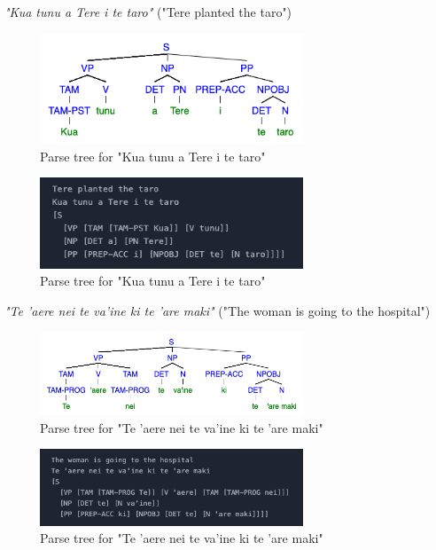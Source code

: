 \begin{enumarabic}
  \item \emph{"Kua tunu a Tere i te taro"} ("Tere planted the taro")
    
    \begin{figure}[H]
      \centering
      \includegraphics[width=0.7\textwidth]{figures/1.1.png}
      \caption{Parse tree for "Kua tunu a Tere i te taro"}
    \end{figure}

    \begin{figure}[H]
      \centering
      \includegraphics[width=0.7\textwidth]{figures/1.1b.png}
      \caption{Parse tree for "Kua tunu a Tere i te taro"}
    \end{figure}

  \newpage
  \item \emph{"Te 'aere nei te va'ine ki te 'are maki"} ("The woman is going to the hospital")
      
    \begin{figure}[H]
      \centering
      \includegraphics[width=0.7\textwidth]{figures/1.2.png}
      \caption{Parse tree for "Te 'aere nei te va'ine ki te 'are maki"}
    \end{figure}

    \begin{figure}[H]
      \centering
      \includegraphics[width=0.7\textwidth]{figures/1.2b.png}
      \caption{Parse tree for "Te 'aere nei te va'ine ki te 'are maki"}
    \end{figure}


\end{enumarabic}
